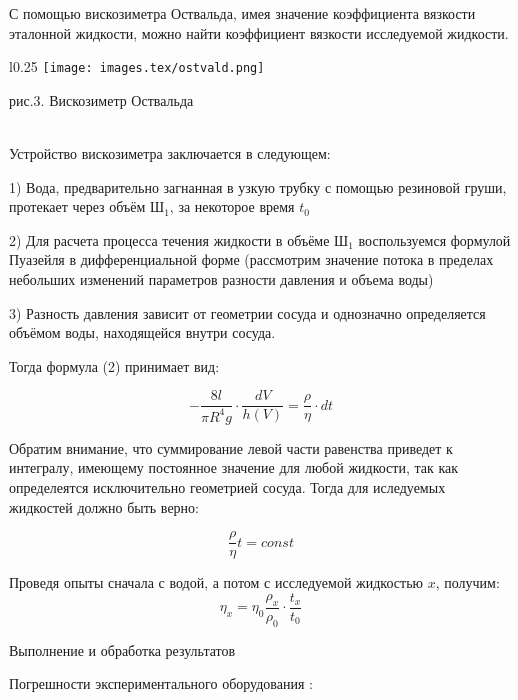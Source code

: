 \documentclass{article}
\begin{document}
С помощью вискозиметра Оствальда, имея значение коэффициента вязкости эталонной жидкости, можно найти коэффициент вязкости исследуемой жидкости.

\begin{wrapfigure}{l}{0.25\textwidth}
    \centering
    \texttt{[image: images.tex/ostvald.png]}

    рис.3. Вискозиметр Оствальда
\end{wrapfigure}
\\

Устройство вискозиметра заключается в следующем:

1) Вода, предварительно загнанная в узкую трубку с помощью резиновой груши, протекает через объём Ш\(_{1}\), за некоторое время \(t_{0}\)

2) Для расчета процесса течения жидкости в объёме Ш\(_{1}\) воспользуемся формулой Пуазейля в дифференциальной форме (рассмотрим значение потока в пределах небольших изменений параметров разности давления и объема воды)

3) Разность давления зависит от геометрии сосуда и однозначно определяется объёмом воды, находящейся внутри сосуда.

Тогда формула (2) принимает вид:

\begin{equation}
    -\frac{8l}{\pi R^{4} g} \cdot \frac{dV}{h(V)} = \frac{\rho}{\eta} \cdot dt
\end{equation}

Обратим внимание, что суммирование левой части равенства приведет к интегралу, имеющему постоянное значение для любой жидкости, так как определеятся исключительно геометрией сосуда. Тогда для иследуемых жидкостей должно быть верно:

\begin{equation}
    \frac{\rho}{\eta} t = const
\end{equation}

Проведя опыты сначала с водой, а потом с исследуемой жидкостью \(x\), получим:
\begin{equation}
    \eta_{x} = \eta_{0} \frac{\rho_{x}}{\rho_{0}} \cdot \frac{t_{x}}{t_{0}}
\end{equation}

\begin{center}
    \raggedleft
    {
        \LARGE {Выполнение и обработка результатов}
    }
    \hline
    \hline
\end{center}

Погрешности экспериментального оборудования :
\end{document}
